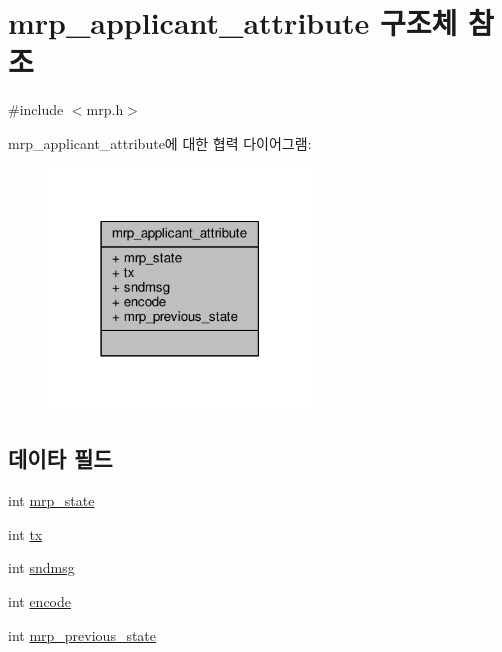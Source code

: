 \hypertarget{structmrp__applicant__attribute}{}\section{mrp\+\_\+applicant\+\_\+attribute 구조체 참조}
\label{structmrp__applicant__attribute}


{\ttfamily \#include $<$mrp.\+h$>$}



mrp\+\_\+applicant\+\_\+attribute에 대한 협력 다이어그램\+:
\nopagebreak
\begin{figure}[H]
\begin{center}
\leavevmode
\includegraphics[width=198pt]{structmrp__applicant__attribute__coll__graph}
\end{center}
\end{figure}
\subsection*{데이타 필드}
\begin{DoxyCompactItemize}
\item 
int \hyperlink{structmrp__applicant__attribute_a81aba50506912ce81758c19f9859445e}{mrp\+\_\+state}
\item 
int \hyperlink{structmrp__applicant__attribute_a40590f55f82df430f8035df8dd4f03c2}{tx}
\item 
int \hyperlink{structmrp__applicant__attribute_ab5da457547f90222856e97e186840f16}{sndmsg}
\item 
int \hyperlink{structmrp__applicant__attribute_a29558c1e60f974924d00ebfe5daa02d2}{encode}
\item 
int \hyperlink{structmrp__applicant__attribute_a36519f39fcb22bd3b6b05b51d2bb7fbf}{mrp\+\_\+previous\+\_\+state}
\end{DoxyCompactItemize}



